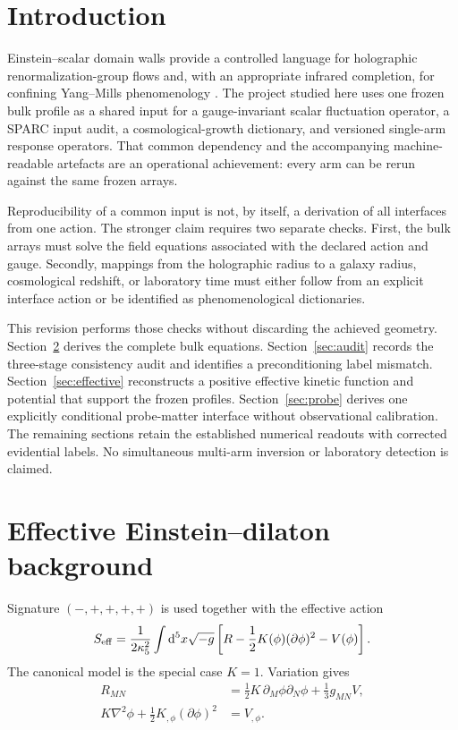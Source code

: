 \documentclass[10pt]{article}
\newcommand{\Kphi}{K(\phi)}
\newcommand{\dd}{\mathrm{d}}
\begin{document}
\section{Introduction}

Einstein--scalar domain walls provide a controlled language for holographic
renormalization-group flows and, with an appropriate infrared completion, for
confining Yang--Mills phenomenology \citep{DeWolfe2000,Gursoy2008,Gursoy2011}.
The project studied here uses one frozen bulk profile as a shared input for a
gauge-invariant scalar fluctuation operator, a SPARC input audit, a
cosmological-growth dictionary, and versioned single-arm response operators.
That common dependency and the accompanying machine-readable artefacts are an
operational achievement: every arm can be rerun against the same frozen arrays.

Reproducibility of a common input is not, by itself, a derivation of all
interfaces from one action.  The stronger claim requires two separate checks.
First, the bulk arrays must solve the field equations associated with the
declared action and gauge.  Secondly, mappings from the holographic radius to a
galaxy radius, cosmological redshift, or laboratory time must either follow
from an explicit interface action or be identified as phenomenological
dictionaries.

This revision performs those checks without discarding the achieved geometry.
Section~\ref{sec:action} derives the complete bulk equations.  Section~\ref{sec:audit}
records the three-stage consistency audit and identifies a preconditioning
label mismatch.  Section~\ref{sec:effective} reconstructs a positive effective
kinetic function and potential that support the frozen profiles.
Section~\ref{sec:probe} derives one explicitly conditional probe-matter
interface without observational calibration.  The remaining sections retain
the established numerical readouts with corrected evidential labels.  No
simultaneous multi-arm inversion or laboratory detection is claimed.

\section{Effective Einstein--dilaton background}
\label{sec:action}

Signature $(-,+,+,+,+)$ is used together with the effective action
\begin{equation}
 S_{\rm eff}=\frac{1}{2\kappa_5^2}\int\dd^5x\sqrt{-g}
 \left[R-\frac12\Kphi(\partial\phi)^2-V(\phi)\right].
 \label{eq:action}
\end{equation}
The canonical model is the special case $K=1$.  Variation gives
\begin{align}
 R_{MN}&=\frac12K\,\partial_M\phi\partial_N\phi+\frac13g_{MN}V,\label{eq:einstein}\\
 K\nabla^2\phi+\frac12K_{,\phi}(\partial\phi)^2&=V_{,\phi}.
 \label{eq:scalarcov}
\end{align}
\end{document}

